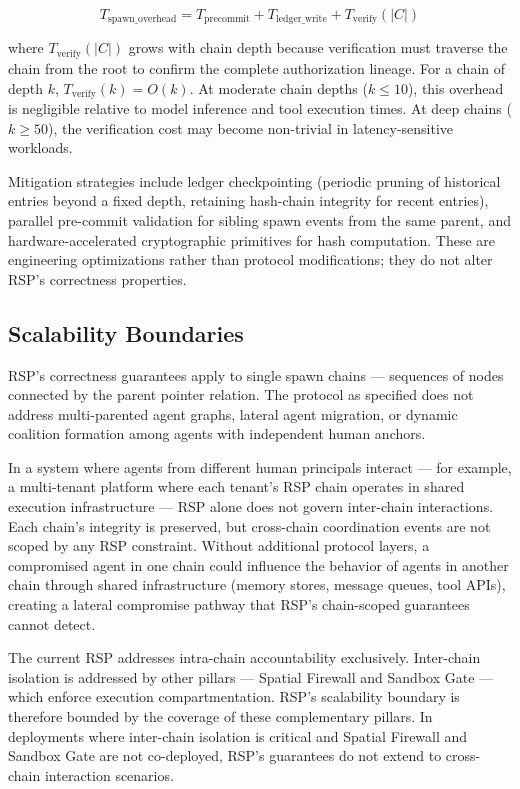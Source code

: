 \begin{equation}
T_{\mathrm{spawn\_overhead}} = T_{\mathrm{precommit}} + T_{\mathrm{ledger\_write}} + T_{\mathrm{verify}}(|C|)
\label{eq:spawn-overhead}
\end{equation}

where $T_{\mathrm{verify}}(|C|)$ grows with chain depth because verification must traverse the chain from the root to confirm the complete authorization lineage. For a chain of depth $k$, $T_{\mathrm{verify}}(k) = O(k)$. At moderate chain depths ($k \leq 10$), this overhead is negligible relative to model inference and tool execution times. At deep chains ($k \geq 50$), the verification cost may become non-trivial in latency-sensitive workloads.

Mitigation strategies include ledger checkpointing (periodic pruning of historical entries beyond a fixed depth, retaining hash-chain integrity for recent entries), parallel pre-commit validation for sibling spawn events from the same parent, and hardware-accelerated cryptographic primitives for hash computation. These are engineering optimizations rather than protocol modifications; they do not alter RSP's correctness properties.

\subsection{Scalability Boundaries}
\label{sec:rs-limitations-scalability}

RSP's correctness guarantees apply to single spawn chains — sequences of nodes connected by the parent pointer relation. The protocol as specified does not address multi-parented agent graphs, lateral agent migration, or dynamic coalition formation among agents with independent human anchors.

In a system where agents from different human principals interact — for example, a multi-tenant platform where each tenant's RSP chain operates in shared execution infrastructure — RSP alone does not govern inter-chain interactions. Each chain's integrity is preserved, but cross-chain coordination events are not scoped by any RSP constraint. Without additional protocol layers, a compromised agent in one chain could influence the behavior of agents in another chain through shared infrastructure (memory stores, message queues, tool APIs), creating a lateral compromise pathway that RSP's chain-scoped guarantees cannot detect.

The current RSP addresses intra-chain accountability exclusively. Inter-chain isolation is addressed by other \bxthree pillars — Spatial Firewall and Sandbox Gate — which enforce execution compartmentation. RSP's scalability boundary is therefore bounded by the coverage of these complementary pillars. In deployments where inter-chain isolation is critical and Spatial Firewall and Sandbox Gate are not co-deployed, RSP's guarantees do not extend to cross-chain interaction scenarios.

